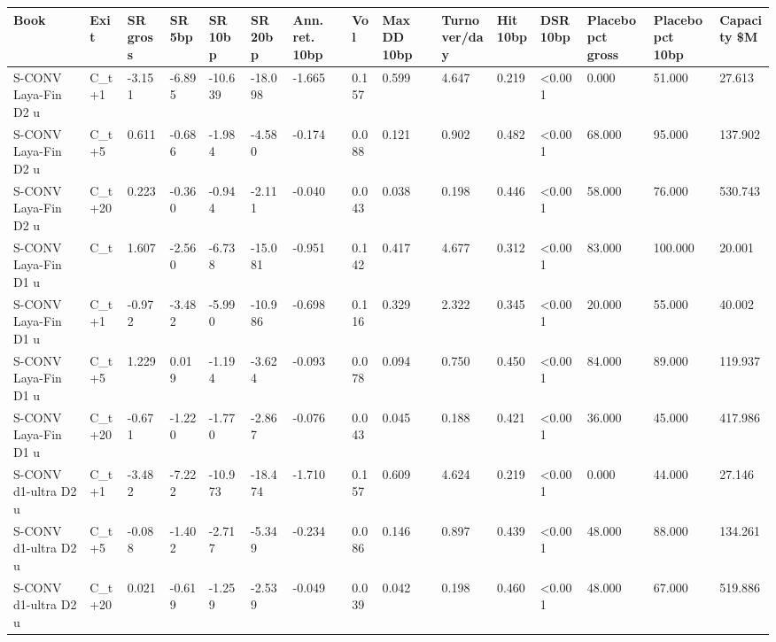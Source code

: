 \begin{tabular}{lllllllllllllll}
\toprule
Book & Exit & SR gross & SR 5bp & SR 10bp & SR 20bp & Ann. ret. 10bp & Vol & Max DD 10bp & Turnover/day & Hit 10bp & DSR 10bp & Placebo pct gross & Placebo pct 10bp & Capacity \$M \\
\midrule
S-CONV Laya-Fin D2 u & C\_t+1 & -3.151 & -6.895 & -10.639 & -18.098 & -1.665 & 0.157 & 0.599 & 4.647 & 0.219 & <0.001 & 0.000 & 51.000 & 27.613 \\
S-CONV Laya-Fin D2 u & C\_t+5 & 0.611 & -0.686 & -1.984 & -4.580 & -0.174 & 0.088 & 0.121 & 0.902 & 0.482 & <0.001 & 68.000 & 95.000 & 137.902 \\
S-CONV Laya-Fin D2 u & C\_t+20 & 0.223 & -0.360 & -0.944 & -2.111 & -0.040 & 0.043 & 0.038 & 0.198 & 0.446 & <0.001 & 58.000 & 76.000 & 530.743 \\
S-CONV Laya-Fin D1 u & C\_t & 1.607 & -2.560 & -6.738 & -15.081 & -0.951 & 0.142 & 0.417 & 4.677 & 0.312 & <0.001 & 83.000 & 100.000 & 20.001 \\
S-CONV Laya-Fin D1 u & C\_t+1 & -0.972 & -3.482 & -5.990 & -10.986 & -0.698 & 0.116 & 0.329 & 2.322 & 0.345 & <0.001 & 20.000 & 55.000 & 40.002 \\
S-CONV Laya-Fin D1 u & C\_t+5 & 1.229 & 0.019 & -1.194 & -3.624 & -0.093 & 0.078 & 0.094 & 0.750 & 0.450 & <0.001 & 84.000 & 89.000 & 119.937 \\
S-CONV Laya-Fin D1 u & C\_t+20 & -0.671 & -1.220 & -1.770 & -2.867 & -0.076 & 0.043 & 0.045 & 0.188 & 0.421 & <0.001 & 36.000 & 45.000 & 417.986 \\
S-CONV d1-ultra D2 u & C\_t+1 & -3.482 & -7.222 & -10.973 & -18.474 & -1.710 & 0.157 & 0.609 & 4.624 & 0.219 & <0.001 & 0.000 & 44.000 & 27.146 \\
S-CONV d1-ultra D2 u & C\_t+5 & -0.088 & -1.402 & -2.717 & -5.349 & -0.234 & 0.086 & 0.146 & 0.897 & 0.439 & <0.001 & 48.000 & 88.000 & 134.261 \\
S-CONV d1-ultra D2 u & C\_t+20 & 0.021 & -0.619 & -1.259 & -2.539 & -0.049 & 0.039 & 0.042 & 0.198 & 0.460 & <0.001 & 48.000 & 67.000 & 519.886 \\

\end{tabular}
